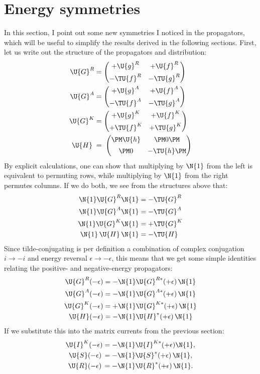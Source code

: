 \section{Energy symmetries}
In this section, I point out some new symmetries I noticed in the propagators, which will be useful to simplify the results derived in the following sections.
First, let us write out the structure of the propagators and distribution:
\begin{align}
  \U{G}^R &= 
  \begin{pmatrix}
    +\U{g}^R  & +\U{f}^R  \\[1ex]
   -\TU{f}^R & -\TU{g}^R
  \end{pmatrix} \\
  \U{G}^A &= 
  \begin{pmatrix}
    +\U{g}^A  & +\U{f}^A  \\[1ex]
   -\TU{f}^A & -\TU{g}^A
  \end{pmatrix} \\
  \U{G}^K &= 
  \begin{pmatrix}
    +\U{g}^K  & +\U{f}^K  \\[1ex]
   +\TU{f}^K & +\TU{g}^K
  \end{pmatrix} \\
  \U{H} \;&= \;
  \begin{pmatrix}
    \PM\U{h}  & \PM0\PM  \\[1ex]
    \PM0      & -\TU{h}\PM
  \end{pmatrix}
\end{align}
By explicit calculations, one can show that multiplying by $\N{1}$ from the left is equivalent to permuting rows, while multiplying by $\N{1}$ from the right permutes columns.
If we do both, we see from the structures above that:
\begin{align}
  \N{1} \U{G}^R \N{1}   &= -\TU{G}^R \\
  \N{1} \U{G}^A \N{1}   &= -\TU{G}^A \\
  \N{1} \U{G}^K \N{1}   &= +\TU{G}^K \\
  \N{1} \,\U{H}\, \N{1} &= -\TU{H}
\end{align}
Since tilde-conjugating is per definition a combination of complex conjugation $i \rightarrow -i$ and energy reversal $\epsilon \rightarrow -\epsilon$, this means that we get some simple identities relating the positive- and negative-energy propagators:
\begin{align}
  \U{G}^R(-\epsilon) &= -\N{1}\U{G}^{R*}(+\epsilon)\,\N{1} \\
  \U{G}^A(-\epsilon) &= -\N{1}\U{G}^{A*}(+\epsilon)\,\N{1} \\
  \U{G}^K(-\epsilon) &= +\N{1}\U{G}^{K*}(+\epsilon)\,\N{1} \\
  \U{H}(-\epsilon)   &= -\N{1}\U{H}^{*}(+\epsilon) \,\N{1}
\end{align}
If we substitute this into the matrix currents from the previous section:
\begin{align}
  \U{I}^K(-\epsilon) &= -\N{1} \U{I}^{K*}(+\epsilon)\N{1}, \\
  \U{S}(-\epsilon)\, &= -\N{1} \U{S}^*(+\epsilon)\, \N{1}, \\
  \U{R}(-\epsilon)\, &= -\N{1} \U{R}^*(+\epsilon)\, \N{1}.
\end{align}


